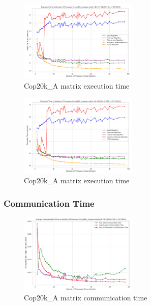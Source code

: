 \documentclass[12pt,oneside]{book} %
\begin{document}
\begin{figure}[H]
    \centering
    \includegraphics[width=0.5\textwidth]{../results/fat_vector_dim/cop20k_A_k9_execution_time.png}
    \caption{Cop20k\_A matrix execution time}\label{fig:cop20k-a-k9-execution-time}
\end{figure}

\begin{figure}[H]
    \centering
    \includegraphics[width=0.5\textwidth]{../results/fat_vector_dim/cop20k_A_k12_execution_time.png}
    \caption{Cop20k\_A matrix execution time}\label{fig:cop20k-a-k12-execution-time}
\end{figure}

\subsubsection{Communication Time}

\begin{figure}[H]
    \centering
    \includegraphics[width=0.5\textwidth]{../results/fat_vector_dim/cop20k_A_k1_communication_time.png}
    \caption{Cop20k\_A matrix communication time}\label{fig:cop20k-a-k1-communication-time}
\end{figure}
\end{document}
